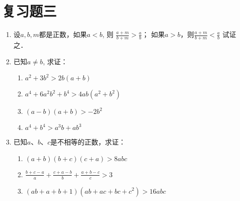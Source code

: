 \section*{复习题三}
\begin{enumerate}
\item   设$a,b,m$都是正数，如果$a<b$, 则
$\frac{a+m}{b+m}>\frac{a}{b}$；
如果$a>b$，则$\frac{a+m}{b+m}<\frac{a}{b}$
试证之．

\item  已知$a\ne b$, 求证：
\begin{multicols}{2}
\begin{enumerate}
    \item $a^2+3b^2>2b(a+b)$
    \item $a^4+6a^2b^2+b^4>4ab(a^2 +b^2)$
    \item $(a-b)(a+b)>-2b^2$
    \item $a^4+b^4>a^3b+ab^3$
\end{enumerate}
\end{multicols}

\item 已知$a$、$b$、$c$是不相等的正数，求证：
\begin{enumerate}
    \item $(a+b)(b+c)(c+a)>8abc$
    \item $\frac{b+c-a}{a}+\frac{c+a-b}{b}+\frac{a+b-c}{c}>3$
    \item $(ab+a+b+1)(ab+ac+bc+c^2)>16abc$
\end{enumerate}


\end{enumerate}
